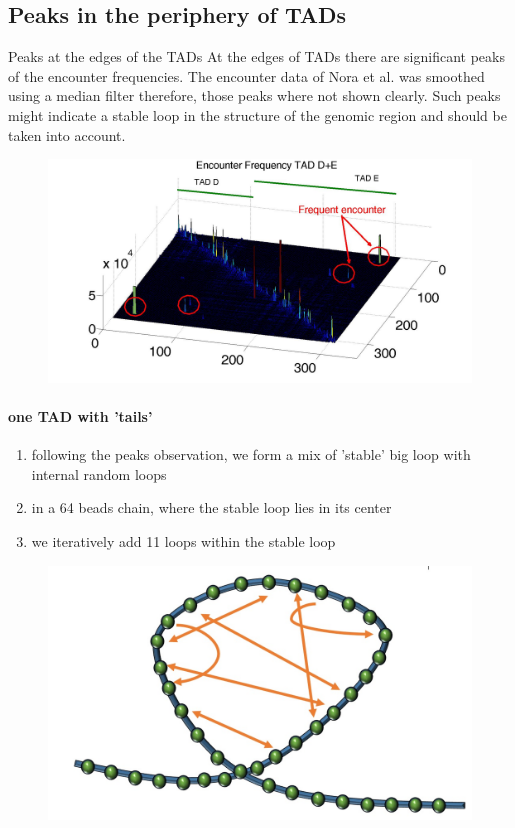 \documentclass[8pt]{beamer}
\begin{document}
\subsection{Peaks in the periphery of TADs}\label{subsection_peaksInThePeripheryOfTADs}
\begin{frame}{Peaks at the edges of the TADs}
At the edges of TADs there are significant peaks of the encounter frequencies.
The encounter data of Nora et al. was smoothed using a median filter therefore, those peaks where not shown clearly.
Such peaks might indicate a stable loop in the structure of the genomic region and should be taken into account.

\begin{figure}[H]
\includegraphics[scale=0.2]{peaksOfTADDAndEInSurfPlot}
\end{figure}
\end{frame}

\begin{frame}
\framesubtitle{one TAD with 'tails'}
\begin{enumerate}
\item following the peaks observation, we form a mix of 'stable' big loop with internal random loops
\item in a 64 beads chain, where the stable loop lies in its center
\item we iteratively add 11 loops within the stable loop
\end{enumerate}
\begin{figure}[H]
\includegraphics[scale=0.1]{polymerModelWithLoopAndInternalConnectors}
\end{figure}
\end{frame}
\end{document}
